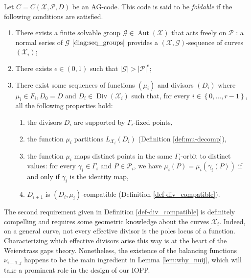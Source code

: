 \documentclass[10pt,a4paper]{article}
\DeclareMathOperator{\Aut}{Aut}
\DeclareMathOperator{\Div}{Div}
\renewcommand{\vec}[1]{\boldsymbol{#1}}
\newcommand{\set}[1]{\left\{#1\right\}}
\newcommand{\size}[1]{\left|#1\right|}
\newcommand{\range}[1]{\set{0,\dots,#1-1}}
\newcommand\calX{\mathcal{X}}
\newcommand\calP{\mathcal{P}}
\newcommand\calG{\mathcal{G}}
\newcommand\XGseq{(\calX, \vec{\calG})}
\theoremstyle{plain}
\theoremstyle{plain}
\theoremstyle{definition}
\theoremstyle{remark}
\theoremstyle{plain}
\begin{document}
\begin{definition}\label{def:good_properties}
    Let $C =C(\calX,\calP,D)$ be an AG-code. This code is said to be \emph{foldable} if the following conditions are satisfied.
    \begin{enumerate}
        \item\label{it:gpe} There exists a finite solvable group $\calG \in \Aut(\calX)$ that acts freely on $\calP$ : a normal series of $\calG$ $\eqref{diag:seq_groups}$ provides a $\XGseq$-sequence of curves $(\calX_i)$;
        \item\label{it:card} There exists $e \in (0,1)$ such that $\size{\calG} > \size{\calP}^e$;
        \item\label{it:cdt} There exist some sequences of functions $(\mu_i)$ and divisors $(D_i)$ where $\mu_i \in F_i, D_0=D$ and  $D_i \in \Div(\calX_i)$ such that, for every $i \in \range{r}$, all the following properties hold:
        \begin{enumerate}
            \item the divisors $D_i$ are supported by $\Gamma_i$-fixed points,
            \item the function $\mu_i$ partitions $L_{\calX_i}(D_i)$ (Definition \ref{def:mu-decomp}),
            \item\label{sit:dif-values} the function $\mu_i$ maps distinct points in the same $\Gamma_i$-orbit to distinct values: for every $\gamma_i \in \Gamma_i$ and $P \in \calP_i$, we have $\mu_i(P)= \mu_i(\gamma_i(P))$ if and only if $\gamma_i$ is the identity map,
            \item  $D_{i+1}$ is $(D_i,\mu_i)$-compatible (Definition \ref{def-div_compatible}).			
        \end{enumerate}
        
    \end{enumerate}
\end{definition}



The second requirement given in Definition \ref{def-div_compatible} is definitely compelling and requires some geometric knowledge about the curves $\calX_i$. Indeed, on a general curve, not every effective divisor is the poles locus of a function. Characterizing which effective divisors arise this way is at the heart of the Weierstrass gaps theory. Nonetheless, the existence of the balancing functions $\nu_{i+1,j}$ happens to be the main ingredient in Lemma \ref{lem:why_nuij}, which will take a prominent role in the design of our IOPP.
\end{document}
